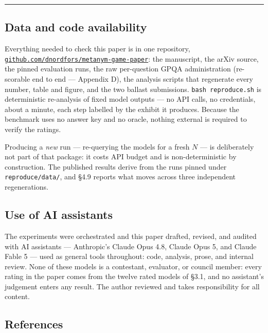 \begin{center}\rule{0.5\linewidth}{0.5pt}\end{center}

\subsection{Data and code availability}\label{data-and-code-availability}

Everything needed to check this paper is in one repository, \href{https://github.com/dnordfors/metanym-game-paper}{\texttt{github.com/dnordfors/metanym-game-paper}}: the manuscript, the arXiv source, the pinned evaluation runs, the raw per-question GPQA administration (re-scorable end to end --- Appendix D), the analysis scripts that regenerate every number, table and figure, and the two ballast submissions. \texttt{bash\ reproduce.sh} is deterministic re-analysis of fixed model outputs --- no API calls, no credentials, about a minute, each step labelled by the exhibit it produces. Because the benchmark uses no answer key and no oracle, nothing external is required to verify the ratings.

Producing a \emph{new} run --- re-querying the models for a fresh \(N\) --- is deliberately not part of that package: it costs API budget and is non-deterministic by construction. The published results derive from the runs pinned under \texttt{reproduce/data/}, and §4.9 reports what moves across three independent regenerations.

\subsection{Use of AI assistants}\label{use-of-ai-assistants}

The experiments were orchestrated and this paper drafted, revised, and audited with AI assistants --- Anthropic's Claude Opus 4.8, Claude Opus 5, and Claude Fable 5 --- used as general tools throughout: code, analysis, prose, and internal review. None of these models is a contestant, evaluator, or council member: every rating in the paper comes from the twelve rated models of §3.1, and no assistant's judgement enters any result. The author reviewed and takes responsibility for all content.

\subsection{References}\label{references}

